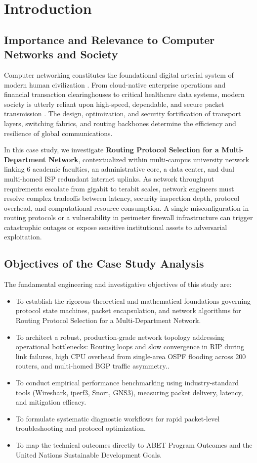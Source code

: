 \section{Introduction}

\subsection{Importance and Relevance to Computer Networks and Society}
Computer networking constitutes the foundational digital arterial system of modern human civilization \cite{kurose2021computer}. From cloud-native enterprise operations and financial transaction clearinghouses to critical healthcare data systems, modern society is utterly reliant upon high-speed, dependable, and secure packet transmission \cite{tanenbaum2021computer}. The design, optimization, and security fortification of transport layers, switching fabrics, and routing backbones determine the efficiency and resilience of global communications.

In this case study, we investigate \textbf{Routing Protocol Selection for a Multi-Department Network}, contextualized within multi-campus university network linking 6 academic faculties, an administrative core, a data center, and dual multi-homed ISP redundant internet uplinks. As network throughput requirements escalate from gigabit to terabit scales, network engineers must resolve complex tradeoffs between latency, security inspection depth, protocol overhead, and computational resource consumption. A single misconfiguration in routing protocols or a vulnerability in perimeter firewall infrastructure can trigger catastrophic outages or expose sensitive institutional assets to adversarial exploitation.

\subsection{Objectives of the Case Study Analysis}
The fundamental engineering and investigative objectives of this study are:
\begin{itemize}
  \item To establish the rigorous theoretical and mathematical foundations governing protocol state machines, packet encapsulation, and network algorithms for Routing Protocol Selection for a Multi-Department Network.
  \item To architect a robust, production-grade network topology addressing operational bottlenecks: Routing loops and slow convergence in RIP during link failures, high CPU overhead from single-area OSPF flooding across 200 routers, and multi-homed BGP traffic asymmetry..
  \item To conduct empirical performance benchmarking using industry-standard tools (Wireshark, iperf3, Snort, GNS3), measuring packet delivery, latency, and mitigation efficacy.
  \item To formulate systematic diagnostic workflows for rapid packet-level troubleshooting and protocol optimization.
  \item To map the technical outcomes directly to ABET Program Outcomes and the United Nations Sustainable Development Goals.
\end{itemize}
